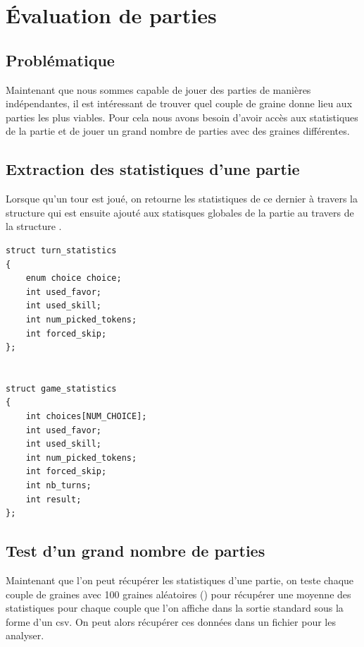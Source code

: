 \section{Évaluation de parties}

\label{evaluator}

\subsection*{Problématique}

Maintenant que nous sommes capable de jouer des parties de manières indépendantes, il est intéressant de trouver quel couple de graine donne lieu aux parties les plus viables. Pour cela nous avons besoin d'avoir accès aux statistiques de la partie et de jouer un grand nombre de parties avec des graines différentes.

\subsection{Extraction des statistiques d'une partie}

Lorsque qu'un tour est joué, on retourne les statistiques de ce dernier à travers la structure  qui est ensuite ajouté aux statisques globales de la partie au travers de la structure .

\begin{lstlisting}[frame=single, caption={Structures pour récupérer les statistiques}]
struct turn_statistics
{
	enum choice choice;
	int used_favor;
	int used_skill;
	int num_picked_tokens;
	int forced_skip;
};


struct game_statistics
{
	int choices[NUM_CHOICE];
	int used_favor;
	int used_skill;
	int num_picked_tokens;
	int forced_skip;
	int nb_turns;
	int result; 
};
\end{lstlisting}

\subsection{Test d'un grand nombre de parties}

Maintenant que l'on peut récupérer les statistiques d'une partie, on teste chaque couple de graines avec 100 graines aléatoires () pour récupérer une moyenne des statistiques pour chaque couple que l'on affiche dans la sortie standard sous la forme d'un csv. On peut alors récupérer ces données dans un fichier pour les analyser.


